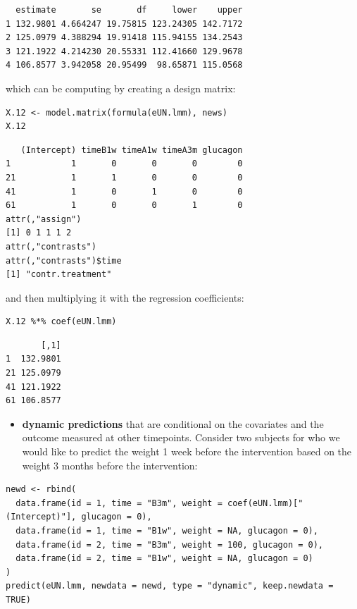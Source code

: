 \documentclass[12pt]{article}
\begin{document}
\begin{verbatim}
  estimate       se       df     lower    upper
1 132.9801 4.664247 19.75815 123.24305 142.7172
2 125.0979 4.388294 19.91418 115.94155 134.2543
3 121.1922 4.214230 20.55331 112.41660 129.9678
4 106.8577 3.942058 20.95499  98.65871 115.0568
\end{verbatim}


which can be computing by creating a design matrix:
\lstset{language=r,label= ,caption= ,captionpos=b,numbers=none}
\begin{lstlisting}
X.12 <- model.matrix(formula(eUN.lmm), news)
X.12
\end{lstlisting}

\begin{verbatim}
   (Intercept) timeB1w timeA1w timeA3m glucagon
1            1       0       0       0        0
21           1       1       0       0        0
41           1       0       1       0        0
61           1       0       0       1        0
attr(,"assign")
[1] 0 1 1 1 2
attr(,"contrasts")
attr(,"contrasts")$time
[1] "contr.treatment"
\end{verbatim}

and then multiplying it with the regression coefficients:
\lstset{language=r,label= ,caption= ,captionpos=b,numbers=none}
\begin{lstlisting}
X.12 %*% coef(eUN.lmm)
\end{lstlisting}

\begin{verbatim}
       [,1]
1  132.9801
21 125.0979
41 121.1922
61 106.8577
\end{verbatim}


\clearpage

\begin{itemize}
\item \textbf{dynamic predictions} that are conditional on the covariates and the
outcome measured at other timepoints. Consider two subjects for who
we would like to predict the weight 1 week before the intervention
based on the weight 3 months before the intervention:
\end{itemize}

\begin{lstlisting}
newd <- rbind(
  data.frame(id = 1, time = "B3m", weight = coef(eUN.lmm)["(Intercept)"], glucagon = 0),
  data.frame(id = 1, time = "B1w", weight = NA, glucagon = 0),
  data.frame(id = 2, time = "B3m", weight = 100, glucagon = 0),
  data.frame(id = 2, time = "B1w", weight = NA, glucagon = 0)
)
predict(eUN.lmm, newdata = newd, type = "dynamic", keep.newdata = TRUE)
\end{lstlisting}
\end{document}
